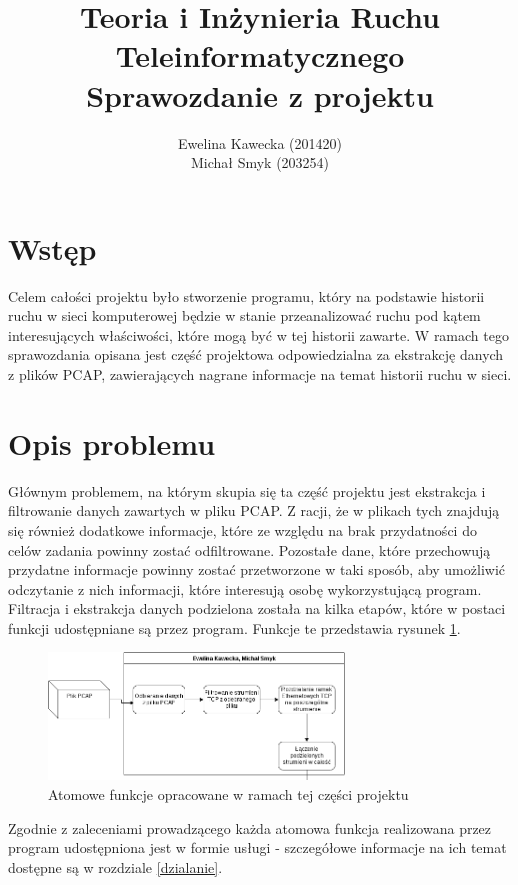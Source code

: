\documentclass[12pt]{article}
\title{Teoria i Inżynieria Ruchu Teleinformatycznego \\ Sprawozdanie z projektu}
\author{Ewelina Kawecka (201420) \\ Michał Smyk (203254)}
\begin{document}
\maketitle
\thispagestyle{empty}
\clearpage
\setcounter{page}{1}

\section{Wstęp}
Celem całości projektu było stworzenie programu, który na podstawie historii ruchu w sieci komputerowej będzie w stanie przeanalizować ruchu pod kątem interesujących właściwości, które mogą być w tej historii zawarte. W ramach tego sprawozdania opisana jest część projektowa odpowiedzialna za ekstrakcję danych z plików PCAP, zawierających nagrane informacje na temat historii ruchu w sieci. 

\section{Opis problemu}
Głównym problemem, na którym skupia się ta część projektu jest ekstrakcja i filtrowanie danych zawartych w pliku PCAP. Z racji, że w plikach tych znajdują się również dodatkowe informacje, które ze względu na brak przydatności do celów zadania powinny zostać odfiltrowane. Pozostałe dane, które przechowują przydatne informacje powinny zostać przetworzone w taki sposób, aby umożliwić odczytanie z nich informacji, które interesują osobę wykorzystującą program. Filtracja i ekstrakcja danych podzielona została na kilka etapów, które w postaci funkcji udostępniane są przez program. Funkcje te przedstawia rysunek \ref{img:funkcje}.

\begin{figure}[h]
\centering
\caption{Atomowe funkcje opracowane w ramach tej części projektu}
\label{img:funkcje}
\includegraphics[width=0.7\textwidth]{Wykres.png}
\end{figure}


Zgodnie z zaleceniami prowadzącego każda atomowa funkcja realizowana przez program udostępniona jest w formie usługi - szczegółowe informacje na ich temat dostępne są w rozdziale \ref{dzialanie}. 
\end{document}
